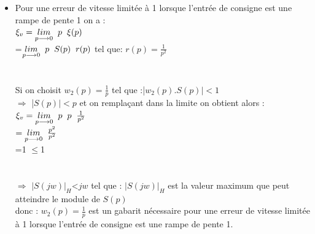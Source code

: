 \documentclass[12pt, a4paper, openany]{report}
\begin{document}
  \begin{itemize}[label=,font=\small\color{black}]
  \item Pour une erreur de vitesse limitée à 1 lorsque l'entrée de consigne est une rampe de pente 1 on a :\\ 
 $\xi_{v}= \underset{p\longrightarrow 0}{lim}\hspace{2mm} p\hspace{2mm}\xi(p)$ \\
    \hspace{2cm}=$\underset{p\longrightarrow 0}{lim}\hspace{2mm} p\hspace{2mm} S(p)\hspace{2mm} r(p)$ \hspace{2cm} tel que: \hspace{0.5cm}$r(p)=\frac {1}{p^{2}}$ \\
     \\[1mm]\\
        Si on choisit $w_{2}(p)=\frac {1}{p} $ \hspace{1cm} tel que :\hspace{2mm}|$w_{2}(p).S(p)|<1$\\
        $\Rightarrow$ |$S(p)|<p$ \hspace{3mm} et on remplaçant dans la limite on obtient alors : \\ 
        $\xi_{v}=\underset{p\longrightarrow 0}{lim}\hspace{2mm} p\hspace{2mm} p \hspace{2mm} \frac {1}{p^{2}} $\\
        $=\underset{p\longrightarrow 0}{lim}\hspace{2mm} \frac {p^{2}}{p^{2}}\hspace{2mm}$\\
        =\hspace{2mm}1 $\leq$1 \\
        \\[5mm]\\
        $\Rightarrow$  \hspace{2mm} $|S(jw)|_{H}$<$jw$  \hspace{2mm} tel que : $|S(jw)|_{H}$ est la valeur maximum que peut atteindre le module de $S(p)$ \\
       donc : $w_{2}(p)=\frac {1}{p} $ \hspace{2mm} est un gabarit nécessaire pour une erreur de vitesse limitée à 1 lorsque l'entrée de consigne est une rampe de pente 1.\\
  \end{itemize} 
\end{document}
